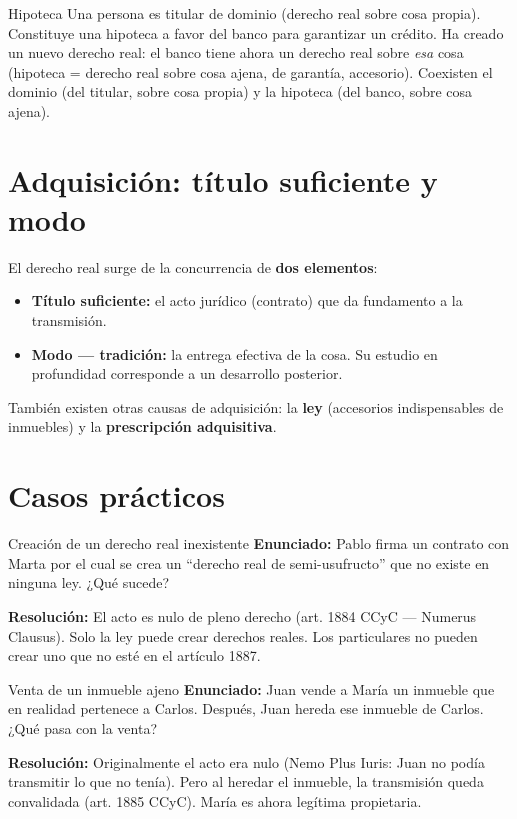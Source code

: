 \documentclass[12pt,oneside]{book}
\begin{document}
\begin{example}{Hipoteca}
Una persona es titular de dominio (derecho real sobre cosa propia). Constituye una hipoteca a favor del banco para garantizar un cr\'edito. Ha creado un nuevo derecho real: el banco tiene ahora un derecho real sobre \textit{esa} cosa (hipoteca = derecho real sobre cosa ajena, de garant\'ia, accesorio). Coexisten el dominio (del titular, sobre cosa propia) y la hipoteca (del banco, sobre cosa ajena).
\end{example}

\section{Adquisici\'on: t\'itulo suficiente y modo}

El derecho real surge de la concurrencia de \textbf{dos elementos}:

\begin{itemize}
    \item \textbf{T\'itulo suficiente:} el acto jur\'idico (contrato) que da fundamento a la transmisi\'on.
    \item \textbf{Modo --- tradici\'on:} la entrega efectiva de la cosa. Su estudio en profundidad corresponde a un desarrollo posterior.
\end{itemize}

Tambi\'en existen otras causas de adquisici\'on: la \textbf{ley} (accesorios indispensables de inmuebles) y la \textbf{prescripci\'on adquisitiva}.

\section{Casos pr\'acticos}

\begin{exercise}{Creaci\'on de un derecho real inexistente}
\textbf{Enunciado:} Pablo firma un contrato con Marta por el cual se crea un ``derecho real de semi-usufructo'' que no existe en ninguna ley. ¿Qu\'e sucede?

\textbf{Resoluci\'on:} El acto es nulo de pleno derecho (art. 1884 CCyC --- Numerus Clausus). Solo la ley puede crear derechos reales. Los particulares no pueden crear uno que no est\'e en el art\'iculo 1887.
\end{exercise}

\begin{exercise}{Venta de un inmueble ajeno}
\textbf{Enunciado:} Juan vende a Mar\'ia un inmueble que en realidad pertenece a Carlos. Despu\'es, Juan hereda ese inmueble de Carlos. ¿Qu\'e pasa con la venta?

\textbf{Resoluci\'on:} Originalmente el acto era nulo (Nemo Plus Iuris: Juan no pod\'ia transmitir lo que no ten\'ia). Pero al heredar el inmueble, la transmisi\'on queda convalidada (art. 1885 CCyC). Mar\'ia es ahora leg\'itima propietaria.
\end{exercise}
\end{document}
